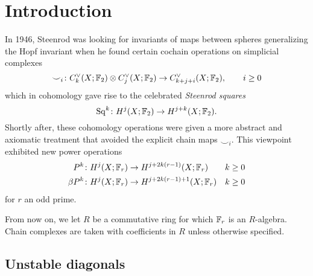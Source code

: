 
\section{Introduction}\label{s:introduction}

In 1946, Steenrod was looking for invariants of maps between spheres generalizing the Hopf invariant when he found certain cochain operations on simplicial complexes
\[
\smile_i \colon \ucocadenas[k](X;\bF_2) \ot \ucocadenas[j](X;\bF_2) \to \ucocadenas[k+j+i](X;\bF_2),\qquad i \geq 0
\]
which in cohomology gave rise to the celebrated \emph{Steenrod squares}
\[
\Sq^{k} \colon H^j(X;\bF_2) \to H^{j+k}(X;\bF_2).
\]
Shortly after, these cohomology operations were given a more abstract and axiomatic treatment that avoided the explicit chain maps $\smile_i$.
This viewpoint exhibited new power operations
\begin{align*}
	P^{k} \colon H^j(X;\bF_r)& \to H^{j+2k(r-1)}(X;\bF_r) & k \geq 0 \\
	\beta P^k \colon H^j(X;\bF_r)& \to H^{j+2k(r-1)+1}(X;\bF_r) & k \geq 0
\end{align*}
for $r$ an odd prime.

From now on, we let $R$ be a commutative ring for which $\bF_r$ is an $R$-algebra.
Chain complexes are taken with coefficients in $R$ unless otherwise specified.

\subsection{Unstable diagonals}

